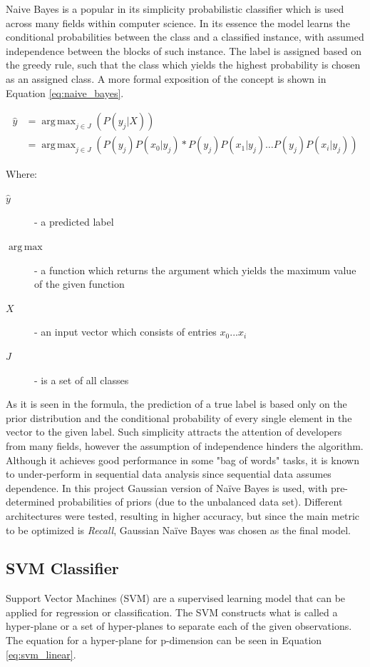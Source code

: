 \documentclass[conference]{sig-alternate-05-2015}
\DeclareMathOperator*{\argmax}{arg\,max}
\begin{document}
Naive Bayes is a popular in its simplicity probabilistic classifier which is
used across many fields within computer science. In its essence the model learns
the conditional probabilities between the class and a classified instance, with
assumed independence between the blocks of such instance. The label is assigned
based on the greedy rule, such that the class which yields the highest
probability is chosen as an assigned class. A more formal exposition of the
concept is shown in Equation \ref{eq:naive_bayes}.\par

\noindent\hrulefill
\begin{equation}
  \label{eq:naive_bayes}
  \begin{aligned}
    \hat{y}&=\argmax_{j \in J}(P(y_j|X)) \\
    &=\argmax_{j\in J}(P(y_j)P(x_0 | y_j) * P(y_j)P(x_1 | y_j) \ldots P(y_j)P(x_i | y_j) )
  \end{aligned}
\end{equation}

\noindent Where:
\begin{description}
  \item[$\hat{y}$] - a predicted label
  \item[$\argmax$] - a function which returns the argument which yields the
  maximum value of the given function
  \item[$X$] - an input vector which consists of entries ${x_0 ... x_i}$
  \item[$J$] - is a set of all classes
\end{description}
\noindent\hrulefill

As it is seen in the formula, the prediction of a true label is based only on
the prior distribution and the conditional probability of every single element
in the vector to the given label. Such simplicity attracts the attention of
developers from many fields, however the assumption of independence hinders the
algorithm. Although it achieves good performance in some "bag of words" tasks,
it is known to under-perform in sequential data analysis since sequential data
assumes dependence. In this project Gaussian version of Na\"ive Bayes is used,
with pre-determined probabilities of priors (due to the unbalanced data set).
Different architectures were tested, resulting in higher accuracy, but since the
main metric to be optimized is \textit{Recall}, Gaussian Na\"ive Bayes was
chosen as the final model.

\subsection{SVM Classifier}\label{subsec:svm_classifier}
Support Vector Machines (SVM) are  a supervised learning model that can be
applied for regression or classification. The SVM constructs what is called a
hyper-plane or a set of hyper-planes to separate each of the given observations.
The equation for a hyper-plane for p-dimension can be seen in Equation
\ref{eq:svm_linear}.\par
\end{document}
